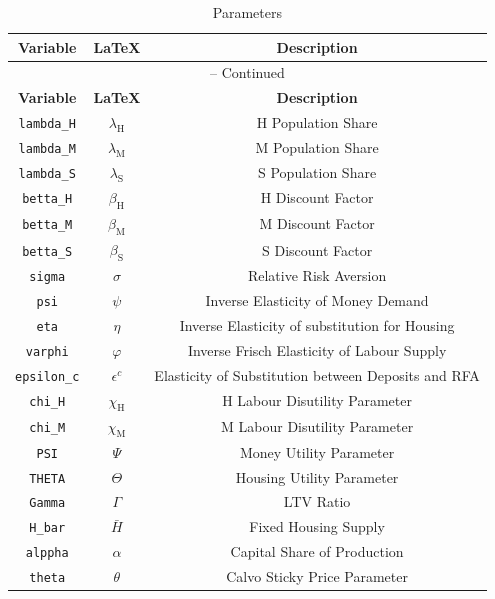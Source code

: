 \begin{center}
\begin{longtable}{ccc}
\caption{Parameters}\\%
\hline%
\multicolumn{1}{c}{\textbf{Variable}} &
\multicolumn{1}{c}{\textbf{\LaTeX}} &
\multicolumn{1}{c}{\textbf{Description}}\\%
\hline\hline%
\endfirsthead
\multicolumn{3}{c}{{\tablename} \thetable{} -- Continued}\\%
\hline%
\multicolumn{1}{c}{\textbf{Variable}} &
\multicolumn{1}{c}{\textbf{\LaTeX}} &
\multicolumn{1}{c}{\textbf{Description}}\\%
\hline\hline%
\endhead
\texttt{lambda\_H} & $\lambda_\mathrm{H}$ & H Population Share\\
\texttt{lambda\_M} & $\lambda_\mathrm{M}$ & M Population Share\\
\texttt{lambda\_S} & $\lambda_\mathrm{S}$ & S Population Share\\
\texttt{betta\_H} & $\beta_\mathrm{H}$ & H Discount Factor\\
\texttt{betta\_M} & $\beta_\mathrm{M}$ & M Discount Factor\\
\texttt{betta\_S} & $\beta_\mathrm{S}$ & S Discount Factor\\
\texttt{sigma} & $\sigma$ & Relative Risk Aversion\\
\texttt{psi} & $\psi$ & Inverse Elasticity of Money Demand\\
\texttt{eta} & $\eta$ & Inverse Elasticity of substitution for Housing\\
\texttt{varphi} & $\varphi$ & Inverse Frisch Elasticity of Labour Supply\\
\texttt{epsilon\_c} & $\epsilon^c$ & Elasticity of Substitution between Deposits and RFA\\
\texttt{chi\_H} & $\chi_\mathrm{H}$ & H Labour Disutility Parameter\\
\texttt{chi\_M} & $\chi_\mathrm{M}$ & M Labour Disutility Parameter\\
\texttt{PSI} & $\Psi$ & Money Utility Parameter\\
\texttt{THETA} & $\Theta$ & Housing Utility Parameter\\
\texttt{Gamma} & $\Gamma$ & LTV Ratio\\
\texttt{H\_bar} & $\bar{H}$ & Fixed Housing Supply\\
\texttt{alppha} & $\alpha$ & Capital Share of Production\\
\texttt{theta} & $\theta$ & Calvo Sticky Price Parameter\\

\end{longtable}
\end{center}
